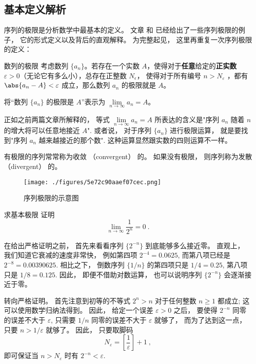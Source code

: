 
\begin{issues}
\end{issues}


\subsection{基本定义解析}

序列的极限是分析数学中最基本的定义。 文章 和  已经给出了一些序列极限的例子， 它的形式定义以及背后的直观解释。 为完整起见， 这里再重复一次序列极限的定义：

\begin{definition}{数列的极限}
考虑数列 $\{a_n\}$。若存在一个实数 $A$，使得对于\textbf{任意}给定的\textbf{正实数} $\varepsilon > 0$（无论它有多么小），总存在正整数 $N_\epsilon$， 使得对于所有编号 $n>N_\varepsilon$ ，都有 $\abs{a_n - A} < \varepsilon$ 成立，那么数列 $a_n$ 的极限就是 $A$。

将“数列 $\{a_n\}$ 的极限是 $A$”表示为 $\lim\limits_{n\to\infty}a_n=A$。
\end{definition}

正如之前两篇文章所解释的， 等式 $\lim\limits_{n\to\infty}a_n=A$ 所表达的含义是"序列 $a_n$ 随着 $n$ 的增大将可以任意地接近 $A$". 或者说， 对于序列 $\{a_n\}$ 进行极限运算， 就是要找到"序列 $a_n$ 越来越接近的那个数". 这种运算显然跟实数的四则运算不一样。

有极限的序列常常称为收敛 （convergent） 的。 如果没有极限， 则序列称为发散 （divergent） 的。
\begin{figure}[ht]
\centering
\texttt{[image: ./figures/5e72c90aaef07cec.png]}
\caption{序列极限的示意图} \label{fig_SeqLim_1}
\end{figure}
\begin{example}{求基本极限}
证明$$\lim\limits_{n\to\infty}\frac{1}{2^n}=0~.$$

在给出严格证明之前， 首先来看看序列 $\{2^{-n}\}$ 到底能够多么接近零。 直观上， 我们知道它衰减的速度非常快， 例如第四项 $2^{-4}=0.0625$, 而第八项已经是 $2^{-8}=0.00390625$. 相比之下， 倒数序列 $\{1/n\}$ 的第四项只是 $1/4=0.25$, 第八项只是 $1/8=0.125$. 因此， 即便不借助对数运算， 也可以说明序列 $\{2^{-n}\}$ 会逐渐接近于零。

转向严格证明。 首先注意到初等的不等式 $2^n>n$ 对于任何整数 $n\geq1$ 都成立; 这可以使用数学归纳法得到。 因此， 给定一个误差 $\varepsilon>0$ 之后， 要使得 $2^{-n}$ 同零的误差不大于 $\varepsilon$, 只需要 $1/n$ 同零的误差不大于 $\varepsilon$ 就够了， 而为了达到这一点， 只要 $n>1/\varepsilon$ 就够了。 因此， 只要取脚码
$$
N_\varepsilon=\left[\frac{1}{\varepsilon}\right]+1~,
$$
即可保证当 $n>N_\varepsilon$ 时有 $2^{-n}<\varepsilon$.
\end{example}

